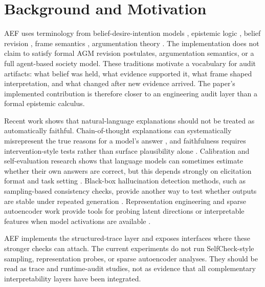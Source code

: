 \documentclass[10pt,a4paper]{article}
\newcommand{\method}{AEF}
\begin{document}
\section{Background and Motivation}
\method{} uses terminology from belief-desire-intention models \citep{bratman1987intention, rao1991modeling, wooldridge2009multiagent}, epistemic logic \citep{fagin2003reasoning}, belief revision \citep{alchourron1985logic, gardenfors1988knowledge}, frame semantics \citep{minsky1974framework, fillmore1976frame, lakoff1987women}, argumentation theory \citep{dung1995acceptability, nute1994defeasible}. The implementation does not claim to satisfy formal AGM revision postulates, argumentation semantics, or a full agent-based society model. These traditions motivate a vocabulary for audit artifacts: what belief was held, what evidence supported it, what frame shaped interpretation, and what changed after new evidence arrived. The paper's implemented contribution is therefore closer to an engineering audit layer than a formal epistemic calculus.

Recent work shows that natural-language explanations should not be treated as automatically faithful. Chain-of-thought explanations can systematically misrepresent the true reasons for a model's answer \citep{arxiv230504388}, and faithfulness requires intervention-style tests rather than surface plausibility alone \citep{arxiv230713702}. Calibration and self-evaluation research shows that language models can sometimes estimate whether their own answers are correct, but this depends strongly on elicitation format and task setting \citep{arxiv220705221}. Black-box hallucination detection methods, such as sampling-based consistency checks, provide another way to test whether outputs are stable under repeated generation \citep{arxiv230308896}. Representation engineering and sparse autoencoder work provide tools for probing latent directions or interpretable features when model activations are available \citep{arxiv231001405, arxiv230908600}.

\method{} implements the structured-trace layer and exposes interfaces where these stronger checks can attach. The current experiments do not run SelfCheck-style sampling, representation probes, or sparse autoencoder analyses. They should be read as trace and runtime-audit studies, not as evidence that all complementary interpretability layers have been integrated.
\end{document}
